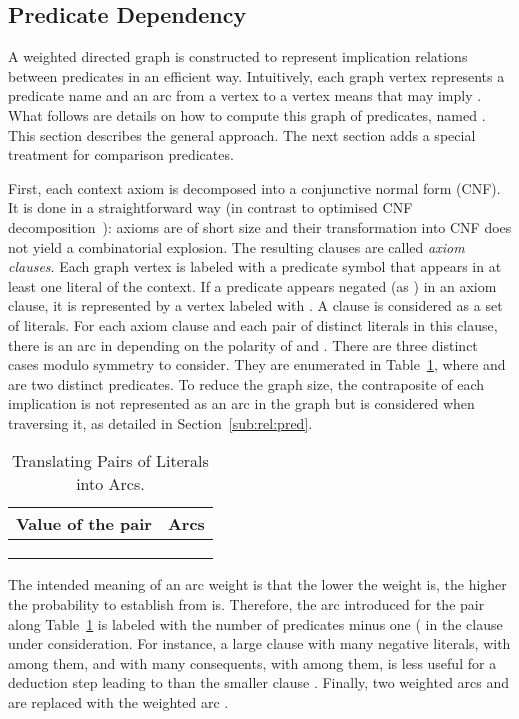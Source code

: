 \documentclass{acm_proc_article-sp}
\theoremstyle{nonumberplain}
\begin{document}
\subsection{Predicate Dependency}\label{sub:dep:stat}
A weighted directed graph is constructed to represent implication
relations between predicates in an efficient way. Intuitively, each
graph vertex represents a predicate name and an arc from a vertex 
to a vertex  means that  may imply . What follows are
details on how to compute this graph of predicates, named . This
section describes the general approach. The next section adds a special
treatment for comparison predicates.


First, each context axiom is decomposed into a conjunctive normal form
(CNF). It is done in a straightforward way (in contrast to optimised
CNF decomposition~\cite{NW01}): axioms are of short size and their
transformation into CNF does not yield a combinatorial explosion. The
resulting clauses are called \emph{axiom clauses}. Each graph vertex is
labeled with a predicate symbol that appears in at least one literal of
the context. If a predicate  appears negated (as ) in an
axiom clause, it is represented by a vertex labeled with
. A clause is considered as a set of literals. For each
axiom clause  and each pair  of distinct literals in this clause, there is an arc in 
depending on the polarity of  and . There are three distinct
cases modulo symmetry to consider. They are enumerated in
Table~\ref{table:edge}, where  and  are two distinct predicates.
To reduce the graph size, the contraposite of each implication is not
represented as an arc in the graph but is considered when traversing
it, as detailed in Section~\ref{sub:rel:pred}.




\begin{table}[hbt!]
\begin{center}
\begin{tabular}{@{~~~}c@{~~~}|@{~~~}c@{~~~}}
Value of the  pair & Arcs \\
\hline
\hline
 &  \\  
 &  \\ 
 &   
\end{tabular}
\end{center}
\caption{Translating Pairs of Literals into Arcs.}\label{table:edge}
\end{table}


The intended meaning of an arc weight is that the lower the weight is,
the higher the probability to establish  from  is. Therefore,
the arc introduced for the pair  along Table~\ref{table:edge}
is labeled with the number of predicates minus one ( in the clause  under consideration. For instance, a large
clause with many negative literals, with  among them, and with
many consequents, with  among them, is less useful for a deduction
step leading to  than the smaller clause .
Finally, two weighted arcs  and  are replaced with the weighted arc .
\end{document}

